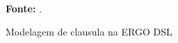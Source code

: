 \begin{figure}[ht!]
\centering

\caption{\textmd{Modelagem de clausula na ERGO DSL}}
\label{fig:ergomodelo}

\par\medskip\textbf{Fonte:} \cite{accordproject}. \par\medskip

\end{figure}

